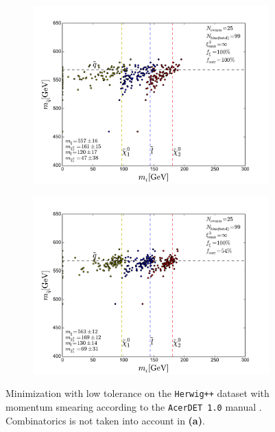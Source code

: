 \documentclass[twoside,english]{uiofysmaster}
\begin{document}
\begin{figure}[hbtp!]
  \centering
  \begin{subfigure}[b]{0.49\textwidth}
    \includegraphics[width=\textwidth]{figures/webber_rec_table/herwigpp_nocombinatorics_acerdetsmearing_original_formulation.pdf} 
    \caption{ }
    \label{fig:acerdetsmear_a}
  \end{subfigure}
  \begin{subfigure}[b]{0.49\textwidth}
    \includegraphics[width=\textwidth]{figures/webber_rec_table/herwigpp_webber-jumping-combinatorics_acerdetsmearing_original_formulation.pdf}
    \caption{ } 
    \label{fig:acerdetsmear_b}
  \end{subfigure}
  \caption{Minimization with low tolerance on the {\tt Herwig++} dataset with momentum smearing according to the {\tt AcerDET 1.0} manual \cite{RichterWas:2002ch}. Combinatorics is not taken into account in {\bf (a)}.}
  \label{fig:acerdetsmear}
\end{figure} 
\end{document}

